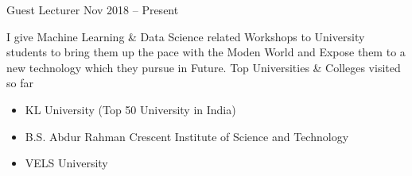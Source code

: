 \vspace{1mm}
\begin{cventries}
    \cventry
    {}
    {Guest Lecturer}
    {Nov 2018 – Present}
    {}
    {I give Machine Learning \& Data Science related Workshops to University students to bring them up the pace with the Moden World and Expose them to a new technology which they pursue in Future. Top Universities \& Colleges visited so far
        \begin{itemize}
        \item KL University (Top 50 University in India)
        \item B.S. Abdur Rahman Crescent Institute of Science and Technology
        \item VELS University
    \end{itemize}}
\end{cventries}
